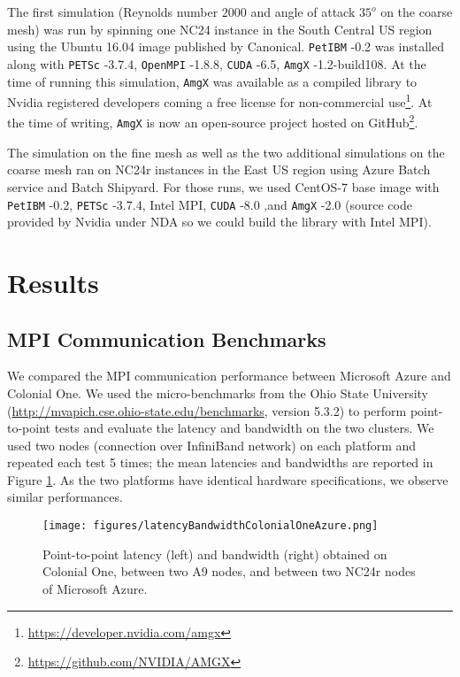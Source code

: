 \documentclass[12pt]{article}
\newcommand{\petibm}{\texttt{PetIBM} }
\newcommand{\petsc}{\texttt{PETSc} }
\newcommand{\cuda}{\texttt{CUDA} }
\newcommand{\amgx}{\texttt{AmgX} }
\newcommand{\openmpi}{\texttt{OpenMPI} }
\begin{document}
The first simulation (Reynolds number $2000$ and angle of attack $35^o$ on the coarse mesh) was run by spinning one NC24 instance in the South Central US region using the Ubuntu 16.04 image published by Canonical.
\petibm-0.2 was installed along with \petsc-3.7.4, \openmpi-1.8.8, \cuda-6.5, \amgx-1.2-build108.
At the time of running this simulation, \amgx was available as a compiled library to Nvidia registered developers coming a free license for non-commercial use\footnote{\url{https://developer.nvidia.com/amgx}}.
At the time of writing, \amgx is now an open-source project hosted on GitHub\footnote{\url{https://github.com/NVIDIA/AMGX}}.

The simulation on the fine mesh as well as the two additional simulations on the coarse mesh ran on NC24r instances in the East US region using Azure Batch service and Batch Shipyard.
For those runs, we used CentOS-7 base image with \petibm-0.2, \petsc-3.7.4, Intel MPI, \cuda-8.0 ,and \amgx-2.0 (source code provided by Nvidia under NDA so we could build the library with Intel MPI).


\section{Results}

\subsection{MPI Communication Benchmarks}

We compared the MPI communication performance between Microsoft Azure and Colonial One.
We used the micro-benchmarks from the Ohio State University (\url{http://mvapich.cse.ohio-state.edu/benchmarks}, version 5.3.2) to perform point-to-point tests and evaluate the latency and bandwidth on the two clusters. We used two nodes (connection over InfiniBand network) on each platform and repeated each test 5 times; the mean latencies and bandwidths are reported in Figure \ref{latency_bandwidth_colonialone_azure}. As the two platforms have identical hardware specifications, we observe similar performances.

\begin{figure}[h!]
\centering
\texttt{[image: figures/latencyBandwidthColonialOneAzure.png]}
\caption{Point-to-point latency (left) and bandwidth (right) obtained on Colonial One, between two A9 nodes, and between two NC24r nodes of Microsoft Azure.}
\label{latency_bandwidth_colonialone_azure}
\end{figure}
\end{document}
